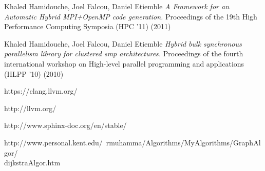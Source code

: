 \documentclass[paper=a4, fontsize=11pt]{scrartcl} %
\numberwithin{equation}{section} %
\numberwithin{figure}{section} %
\numberwithin{table}{section} %
\begin{document}

\begin{thebibliography}{1}

   Khaled Hamidouche, Joel Falcou, Daniel Etiemble {\em A Framework for an Automatic Hybrid MPI+OpenMP code generation.}  Proceedings of the 19th High Performance Computing Symposia (HPC '11) (2011)


   Khaled Hamidouche, Joel Falcou, Daniel Etiemble {\em Hybrid bulk synchronous parallelism library for clustered smp architectures.}  Proceedings of the fourth international workshop on High-level parallel programming and applications (HLPP '10) (2010)

   https://clang.llvm.org/


   http://llvm.org/

  
   http://www.sphinx-doc.org/en/stable/

   http://www.personal.kent.edu/~rmuhamma/Algorithms/MyAlgorithms/GraphAlgor/ \\ dijkstraAlgor.htm








  


\end{thebibliography}
\end{document}
